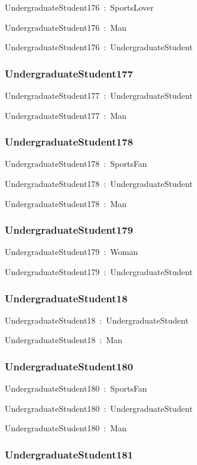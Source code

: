 \documentclass{article}
\begin{document}
UndergraduateStudent176~:~SportsLover

UndergraduateStudent176~:~Man

UndergraduateStudent176~:~UndergraduateStudent

\subsubsection*{UndergraduateStudent177}

UndergraduateStudent177~:~UndergraduateStudent

UndergraduateStudent177~:~Man

\subsubsection*{UndergraduateStudent178}

UndergraduateStudent178~:~SportsFan

UndergraduateStudent178~:~UndergraduateStudent

UndergraduateStudent178~:~Man

\subsubsection*{UndergraduateStudent179}

UndergraduateStudent179~:~Woman

UndergraduateStudent179~:~UndergraduateStudent

\subsubsection*{UndergraduateStudent18}

UndergraduateStudent18~:~UndergraduateStudent

UndergraduateStudent18~:~Man

\subsubsection*{UndergraduateStudent180}

UndergraduateStudent180~:~SportsFan

UndergraduateStudent180~:~UndergraduateStudent

UndergraduateStudent180~:~Man

\subsubsection*{UndergraduateStudent181}
\end{document}
